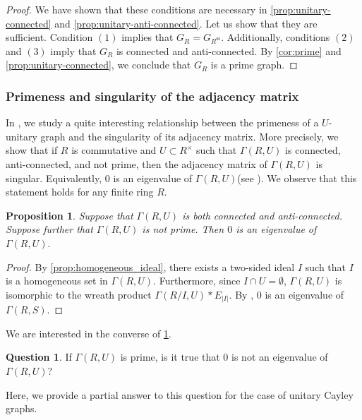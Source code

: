 \documentclass[12pt, a4paper]{amsart}
\newtheorem{prop}[thm]{Proposition}
\theoremstyle{definition}
\newtheorem{question}[thm]{Question}
\numberwithin{equation}{section}
\newcommand{\s}{\text{ss}}
\begin{document}
\begin{proof}
    We have shown that these conditions are necessary in \cref{prop:unitary-connected} and \cref{prop:unitary-anti-connected}. Let us show that they are sufficient. Condition $(1)$ implies that $G_{R}=G_{R^{\s}}$. Additionally, conditions $(2)$ and $(3)$ imply that $G_{R}$ is connected and anti-connected. By \cref{cor:prime} and \cref{prop:unitary-connected}, we conclude that $G_{R}$ is a prime graph. 
\end{proof}

\subsubsection{Primeness and singularity of the adjacency matrix}
In \cite[Section 4.3]{nguyen2025supercharacters}, we study a quite interesting relationship between the primeness of a $U$-unitary graph and the singularity of its adjacency matrix. More precisely, we show that if $R$ is commutative and $U \subset R^{\times}$ such that $\Gamma(R,U)$ is connected, anti-connected, and not prime, then the adjacency matrix of $\Gamma(R,U)$ is singular. Equivalently, $0$ is an eigenvalue of $\Gamma(R,U) $(see \cite[Proposition 4.16]{nguyen2025supercharacters}). We observe that this statement holds for any finite ring $R$. 

\begin{prop} \label{prop:0-eigenvalue}
    Suppose that $\Gamma(R,U)$ is both connected and anti-connected. Suppose further that $\Gamma(R,U)$ is not prime. Then $0$ is an eigenvalue of $\Gamma(R,U).$
\end{prop}

\begin{proof}
By \cref{prop:homogeneous_ideal}, there exists a two-sided ideal $I$ such that $I$ is a homogeneous set in $\Gamma(R,U).$ Furthermore, since $I \cap U = \emptyset$, $\Gamma(R,U)$ is isomorphic to the wreath product $\Gamma(R/I, U) *  E_{|I|}.$ By \cite[Theorem 3.3]{minac2025joins}, $0$ is an eigenvalue of $\Gamma(R,S).$ 
\end{proof}
We are interested in the converse of \cref{prop:0-eigenvalue}.
\begin{question} \label{question:prime-0}
If $ \Gamma(R,U)$ is prime, is it true that $0$ is not an eigenvalue of $\Gamma(R,U)$?  
\end{question}

Here, we provide a partial answer to this question for the case of unitary Cayley graphs. 
\end{document}
